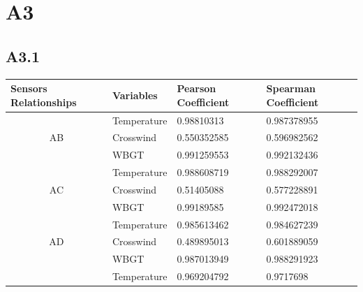 \documentclass[a4paper,12pt]{article}
\begin{document}
\section{A3}
 \subsection{A3.1}
\begin{table}[]
 	\centering
 	\begin{tabular}{llll}
 		\hline
 		\multicolumn{1}{|l|}{Sensors Relationships} & \multicolumn{1}{l|}{Variables}   & \multicolumn{1}{l|}{Pearson Coefficient} & \multicolumn{1}{l|}{Spearman Coefficient} \\ \hline
 		\multicolumn{1}{|c|}{}                      & \multicolumn{1}{l|}{Temperature} & \multicolumn{1}{l|}{0.98810313}          & \multicolumn{1}{l|}{0.987378955}          \\ \hline
 		\multicolumn{1}{|c|}{AB}                    & \multicolumn{1}{l|}{Crosswind}   & \multicolumn{1}{l|}{0.550352585}         & \multicolumn{1}{l|}{0.596982562}          \\ \hline
 		\multicolumn{1}{|l|}{}                      & \multicolumn{1}{l|}{WBGT}        & \multicolumn{1}{l|}{0.991259553}         & \multicolumn{1}{l|}{0.992132436}          \\ \hline
 		& Temperature                      & 0.988608719                              & 0.988292007                               \\
 		\multicolumn{1}{c}{AC}                      & Crosswind                        & 0.51405088                               & 0.577228891                               \\
 		& WBGT                             & 0.99189585                               & 0.992472018                               \\ \hline
 		\multicolumn{1}{|l|}{}                      & \multicolumn{1}{l|}{Temperature} & \multicolumn{1}{l|}{0.985613462}         & \multicolumn{1}{l|}{0.984627239}          \\ \hline
 		\multicolumn{1}{|c|}{AD}                    & \multicolumn{1}{l|}{Crosswind}   & \multicolumn{1}{l|}{0.489895013}         & \multicolumn{1}{l|}{0.601889059}          \\ \hline
 		\multicolumn{1}{|l|}{}                      & \multicolumn{1}{l|}{WBGT}        & \multicolumn{1}{l|}{0.987013949}         & \multicolumn{1}{l|}{0.988291923}          \\ \hline
 		& Temperature                      & 0.969204792                              & 0.9717698                                 \\

\end{tabular}
\end{table}
\end{document}
